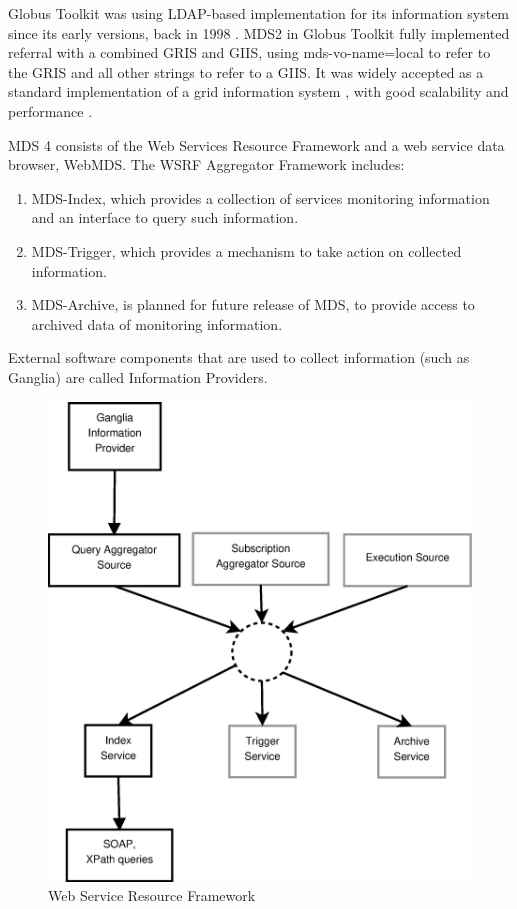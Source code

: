 Globus Toolkit was using LDAP-based implementation for its information system
since its early versions, back in 1998 \cite{von1998usage}. MDS2 in Globus
Toolkit fully implemented referral with a combined GRIS and GIIS, using
mds-vo-name=local to refer to the GRIS and all other strings to refer to a
GIIS. It was widely accepted as a standard implementation of a grid information
system \cite{945188}, with good scalability and performance
\cite{zhang2004performance}.


MDS 4 consists of the Web Services Resource Framework and a web service data
browser, WebMDS. The WSRF Aggregator Framework includes:

\begin{enumerate}
  \item MDS-Index, which provides a collection of services monitoring
  information and an interface to query such information.
  \item MDS-Trigger, which provides a mechanism to take action on collected
  information.
  \item MDS-Archive, is planned for future release of MDS, to provide access to
  archived data of monitoring information.
\end{enumerate}

External software components that are used to collect information (such as
Ganglia)\cite{gangliaWSRF} are called Information Providers.

\begin{figure}[htb]
\centering
 \includegraphics[width=5in]{images/wsrf.eps}
\caption{Web Service Resource Framework}
\label{figure:wsrf}
\end{figure}

